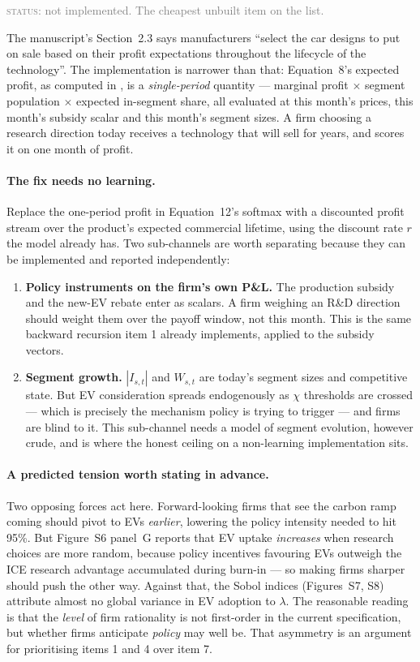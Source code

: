 \documentclass[11pt]{article}
\newcommand{\status}[1]{\textcolor{gray}{\textsc{status:} #1}}
\begin{document}
\status{not implemented. The cheapest unbuilt item on the list.}

The manuscript's Section~2.3 says manufacturers ``select the car designs to
put on sale based on their profit expectations throughout the lifecycle of
the technology''. The implementation is narrower than that: Equation~8's
expected profit, as computed in
, is a
\emph{single-period} quantity --- marginal profit $\times$ segment
population $\times$ expected in-segment share, all evaluated at this
month's prices, this month's subsidy scalar and this month's segment sizes.
A firm choosing a research direction today receives a technology that will
sell for years, and scores it on one month of profit.

\paragraph{The fix needs no learning.} Replace the one-period profit in
Equation~12's softmax with a discounted profit stream over the product's
expected commercial lifetime, using the discount rate $r$ the model already
has. Two sub-channels are worth separating because they can be implemented
and reported independently:
\begin{enumerate}[leftmargin=1.5em]
\item \textbf{Policy instruments on the firm's own P\&L.} The production
  subsidy and the new-EV rebate enter  as scalars.
  A firm weighing an R\&D direction should weight them over the payoff
  window, not this month. This is the same backward recursion item 1
  already implements, applied to the subsidy vectors.
\item \textbf{Segment growth.} $|I_{s,t}|$ and $W_{s,t}$ are today's
  segment sizes and competitive state. But EV consideration spreads
  endogenously as $\chi$ thresholds are crossed --- which is precisely the
  mechanism policy is trying to trigger --- and firms are blind to it. This
  sub-channel needs a model of segment evolution, however crude, and is
  where the honest ceiling on a non-learning implementation sits.
\end{enumerate}

\paragraph{A predicted tension worth stating in advance.} Two opposing
forces act here. Forward-looking firms that see the carbon ramp coming
should pivot to EVs \emph{earlier}, lowering the policy intensity needed to
hit 95\%. But Figure~S6 panel~G reports that EV uptake \emph{increases}
when research choices are more random, because policy incentives favouring
EVs outweigh the ICE research advantage accumulated during burn-in --- so
making firms sharper should push the other way. Against that, the Sobol
indices (Figures~S7, S8) attribute almost no global variance in EV adoption
to $\lambda$. The reasonable reading is that the \emph{level} of firm
rationality is not first-order in the current specification, but whether
firms anticipate \emph{policy} may well be. That asymmetry is an argument
for prioritising items 1 and 4 over item 7.
\end{document}
